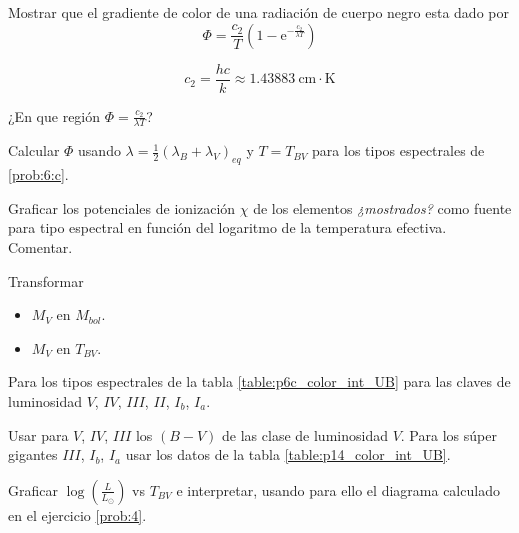 \documentclass[12pt,a4paper]{practice}
\begin{document}
    \begin{problem}\label{prob:12}
        \begin{ppart}\label{prob:12:a}
            Mostrar que el gradiente de color de una radiación de cuerpo negro esta dado por
            $$
                \Phi = \frac{c_2}{T}\left(1 - \mathrm{e}^{-\frac{c_2}{\lambda T}}\right)
            $$

            $$
                c_2 = \frac{hc}{k} \approx 1.43883\ \mathrm{cm \cdot K}
            $$
        \end{ppart}

        \begin{ppart}\label{prob:12:b}
            ¿En que región $\Phi = \frac{c_2}{\lambda T}$?
        \end{ppart}

        \begin{ppart}\label{prob:12:c}
            Calcular $\Phi$ usando $\lambda = \frac{1}{2}\left(\lambda_B + \lambda_V\right)_{eq}$ y $T = T_{BV}$ para los tipos espectrales de \ref{prob:6:c}.
        \end{ppart}
    \end{problem}

    \begin{problem}\label{prob:13}
        Graficar los potenciales de ionización $\chi$ de los elementos \textit{¿mostrados?} como fuente para tipo espectral en función del logaritmo de la temperatura efectiva. Comentar.
    \end{problem}

    \begin{problem}\label{prob:14}
        \begin{ppart}\label{prob:14:a}
        Transformar
            \begin{itemize}
                \item $M_{V}$ en $M_{bol}$.
                \item $M_{V}$ en $T_{BV}$.
            \end{itemize}

            Para los tipos espectrales de la tabla \ref{table:p6c_color_int_UB} para las claves de luminosidad $V$, $IV$, $III$, $II$, $I_{b}$, $I_{a}$.

            Usar para $V$, $IV$, $III$ los $\left(B-V\right)$ de las clase de luminosidad $V$. Para los súper gigantes $III$, $I_{b}$, $I_{a}$ usar los datos de la tabla \ref{table:p14_color_int_UB}.
        \end{ppart}

        \begin{ppart}\label{prob:14:b}
            Graficar $\log\left(\frac{L}{L_\odot}\right)$ vs $T_{BV}$ e interpretar, usando para ello el diagrama calculado en el ejercicio \ref{prob:4}.
        \end{ppart}
    \end{problem}
\end{document}
